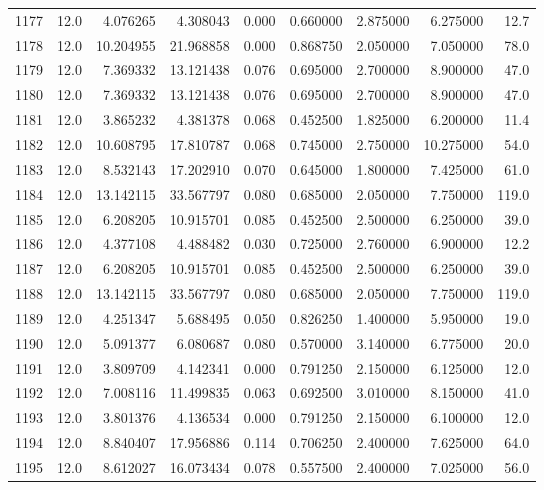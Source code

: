 \begin{tabular}{lrrrrrrrr}
1177 &   12.0 &   4.076265 &   4.308043 &  0.000 &  0.660000 &  2.875000 &   6.275000 &   12.7 \\
1178 &   12.0 &  10.204955 &  21.968858 &  0.000 &  0.868750 &  2.050000 &   7.050000 &   78.0 \\
1179 &   12.0 &   7.369332 &  13.121438 &  0.076 &  0.695000 &  2.700000 &   8.900000 &   47.0 \\
1180 &   12.0 &   7.369332 &  13.121438 &  0.076 &  0.695000 &  2.700000 &   8.900000 &   47.0 \\
1181 &   12.0 &   3.865232 &   4.381378 &  0.068 &  0.452500 &  1.825000 &   6.200000 &   11.4 \\
1182 &   12.0 &  10.608795 &  17.810787 &  0.068 &  0.745000 &  2.750000 &  10.275000 &   54.0 \\
1183 &   12.0 &   8.532143 &  17.202910 &  0.070 &  0.645000 &  1.800000 &   7.425000 &   61.0 \\
1184 &   12.0 &  13.142115 &  33.567797 &  0.080 &  0.685000 &  2.050000 &   7.750000 &  119.0 \\
1185 &   12.0 &   6.208205 &  10.915701 &  0.085 &  0.452500 &  2.500000 &   6.250000 &   39.0 \\
1186 &   12.0 &   4.377108 &   4.488482 &  0.030 &  0.725000 &  2.760000 &   6.900000 &   12.2 \\
1187 &   12.0 &   6.208205 &  10.915701 &  0.085 &  0.452500 &  2.500000 &   6.250000 &   39.0 \\
1188 &   12.0 &  13.142115 &  33.567797 &  0.080 &  0.685000 &  2.050000 &   7.750000 &  119.0 \\
1189 &   12.0 &   4.251347 &   5.688495 &  0.050 &  0.826250 &  1.400000 &   5.950000 &   19.0 \\
1190 &   12.0 &   5.091377 &   6.080687 &  0.080 &  0.570000 &  3.140000 &   6.775000 &   20.0 \\
1191 &   12.0 &   3.809709 &   4.142341 &  0.000 &  0.791250 &  2.150000 &   6.125000 &   12.0 \\
1192 &   12.0 &   7.008116 &  11.499835 &  0.063 &  0.692500 &  3.010000 &   8.150000 &   41.0 \\
1193 &   12.0 &   3.801376 &   4.136534 &  0.000 &  0.791250 &  2.150000 &   6.100000 &   12.0 \\
1194 &   12.0 &   8.840407 &  17.956886 &  0.114 &  0.706250 &  2.400000 &   7.625000 &   64.0 \\
1195 &   12.0 &   8.612027 &  16.073434 &  0.078 &  0.557500 &  2.400000 &   7.025000 &   56.0 \\

\end{tabular}
